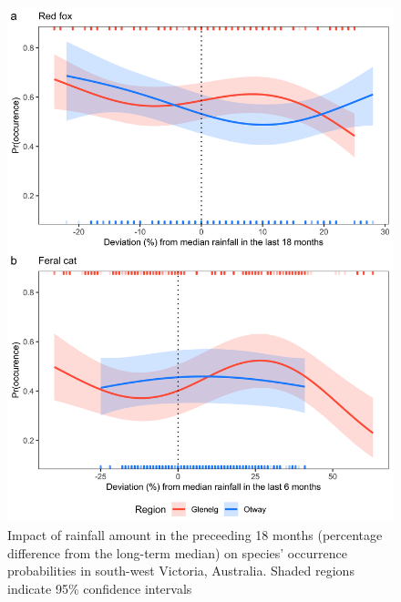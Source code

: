 \documentclass[11pt,a4paper,titlepage,twoside,openright]{style/unimelbthesis}
\begin{document}
\begin{mainmatter}
\begin{figure}
{\centering \includegraphics[width=1\linewidth]{figure/rainfall} 

}

\caption{Impact of rainfall amount in the preceeding 18 months (percentage difference from the long-term median) on species’ occurrence probabilities in south-west Victoria, Australia. Shaded regions indicate 95\% confidence intervals}\label{fig:occ-rainfall}
\end{figure}
\newpage

\(~\)

\(~\)

\(~\)
\begin{figure}


\end{figure}
\end{mainmatter}
\end{document}
